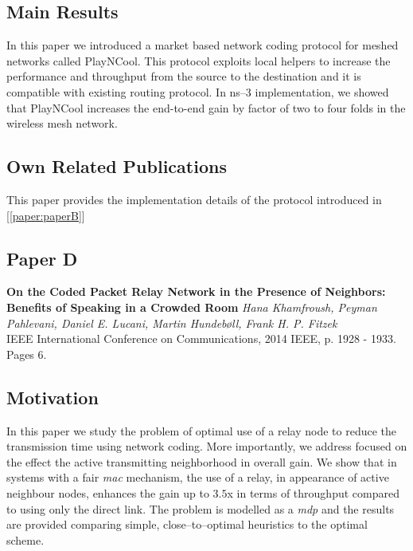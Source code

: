 \subsection*{Main Results}
In this paper we introduced a market based network coding protocol for meshed networks called PlayNCool. This protocol exploits local helpers to increase the performance and throughput from the source to the destination and it is compatible with existing routing protocol. In ns--3 implementation, we showed that PlayNCool increases the end-to-end gain by factor of two to four folds in the wireless mesh network.
\subsection*{Own Related Publications}
This paper provides the implementation details of the protocol introduced in [\ref{paper:paperB}]
\clearpage


\subsection{Paper D}
\textbf{On the Coded Packet Relay Network in the Presence of Neighbors: Benefits of Speaking in a Crowded Room}
\textit{Hana Khamfroush, Peyman Pahlevani, Daniel E. Lucani, Martin Hundeb{\o}ll, Frank H. P. Fitzek}
\\  IEEE International Conference on Communications, 2014 IEEE, p. 1928 - 1933.
\\ Pages 6.
\subsection*{Motivation}
In this paper we study the problem of optimal use of a relay node to reduce the transmission time using network coding. More importantly, we address  focused on the effect the active transmitting neighborhood in overall gain. We show that in systems with a fair \textit{mac} mechanism, the use of a relay, in appearance of active neighbour nodes, enhances the gain up to $3.5$x in terms of throughput compared to using only the direct link. The problem is modelled as a \textit{mdp} and the results are provided comparing simple, close--to--optimal heuristics to the optimal scheme.

